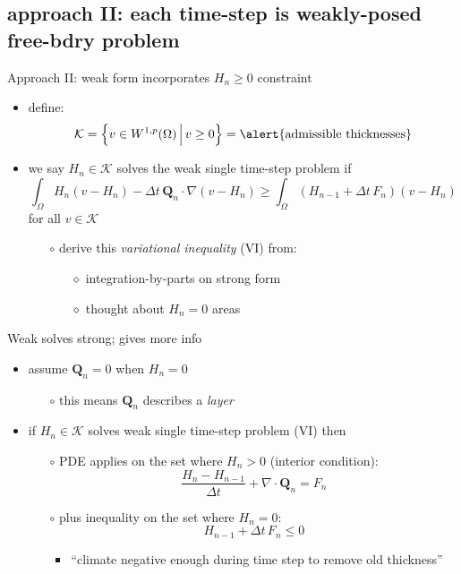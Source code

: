\documentclass{beamer}
\newcommand\bQ{\mathbf{Q}}
\newcommand{\Div}{\nabla\cdot}
\newcommand{\grad}{\nabla}
\begin{document}
\subsection{approach II: each time-step is weakly-posed free-bdry problem}

\begin{frame}{Approach II: weak form incorporates $H_n\ge 0$ constraint}

  \begin{itemize}
  \item define:
    $$\mathcal{K} = \left\{v \in W^{1,p}(\Omega) \,\Big|\, v\ge 0\right\} = \text{\alert{admissible thicknesses}}$$
  \item we say $H_n \in \mathcal{K}$ solves the \alert{weak single time-step problem} if
    $$\int_\Omega H_n (v - H_n) - \Delta t\, \bQ_n \cdot \grad(v - H_n) \ge \int_\Omega \left(H_{n-1} + \Delta t\, F_n\right) (v - H_n)$$
  for all $v \in \mathcal{K}$
  \small
  \medskip
    \begin{itemize}
    \item[$\circ$] derive this \emph{variational inequality} (VI) from:
      \begin{itemize}
      \item[$\diamond$] integration-by-parts on strong form
      \item[$\diamond$] thought about $H_n=0$ areas
      \end{itemize}
    \end{itemize}
  \end{itemize}
\end{frame}


\begin{frame}{Weak solves strong; gives more info}

\begin{itemize}
  \item assume $\bQ_n=0$ when $H_n=0$
    \begin{itemize}
    \item[$\circ$] this means $\bQ_n$ describes a \emph{layer}
    \end{itemize}
  \item if $H_n \in \mathcal{K}$ solves weak single time-step problem (VI) then
  
      \medskip
	  \begin{itemize}
	  \item[$\circ$] PDE applies on the set where $H_n>0$ (interior condition):
	    $$\frac{H_n - H_{n-1}}{\Delta t} + \Div \bQ_n = F_n$$
	  \item[$\circ$] plus inequality on the set where $H_n = 0$:
	    $$H_{n-1} + \Delta t\, F_n \le 0$$
	    \vspace{-6mm}
	    \begin{itemize}
	    \item ``climate negative enough during time step to remove old thickness''
	    \end{itemize}
	  \end{itemize}
\end{itemize}
\end{frame}
\end{document}
